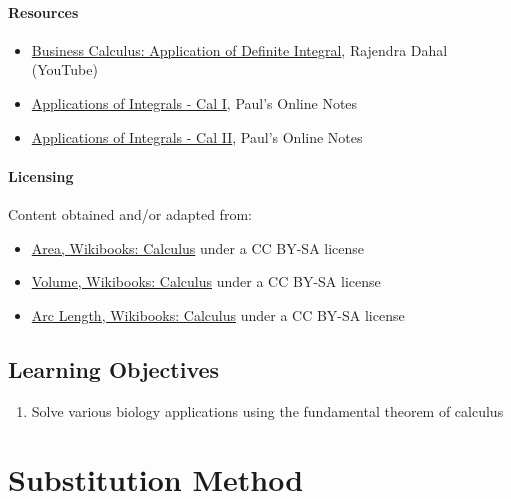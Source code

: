 \paragraph{Resources}

\begin{itemize}
    \item \href{https://www.youtube.com/watch?v=FE0eJGdWC04}{Business Calculus: Application of Definite Integral}, Rajendra Dahal (YouTube)
    \item \href{https://tutorial.math.lamar.edu/classes/calci/intappsintro.aspx}{Applications of Integrals - Cal I}, Paul's Online Notes
    \item \href{https://tutorial.math.lamar.edu/classes/calcii/intappsintro.aspx}{Applications of Integrals - Cal II}, Paul's Online Notes
\end{itemize}

\paragraph{Licensing}

Content obtained and/or adapted from:
\begin{itemize}
    \item \href{https://en.wikibooks.org/wiki/Calculus/Area}{Area, Wikibooks: Calculus} under a CC BY-SA license
    \item \href{https://en.wikibooks.org/wiki/Calculus/Volume}{Volume, Wikibooks: Calculus} under a CC BY-SA license
    \item \href{https://en.wikibooks.org/wiki/Calculus/Arc_length}{Arc Length, Wikibooks: Calculus} under a CC BY-SA license
\end{itemize}

\subsection{Learning Objectives}

\begin{enumerate}
    \item Solve various biology applications using the fundamental theorem of calculus
\end{enumerate}

\section{Substitution Method}
\label{sec:substitution-method}

